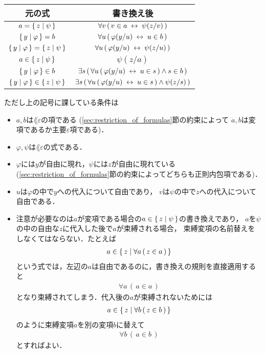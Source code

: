 	\begin{table}[H]
		\begin{center}
		\begin{tabular}{c|c}
			元の式 & 書き換え後 \\ \hline \hline
			$a = \left\{\, z \mid \psi\, \right\}$ & $\forall v\, (\, v \in a \hspace{0.25em}\leftrightarrow\hspace{0.25em} \psi(z/v)\, )$ \\ \hline
			$\left\{\, y \mid \varphi\, \right\} = b$ & $\forall u\, (\, \varphi(y/u) \hspace{0.25em}\leftrightarrow\hspace{0.25em} u \in b\, )$ \\ \hline
			$\left\{\, y \mid \varphi\, \right\} = \left\{\, z \mid \psi\, \right\}$ & $\forall u\, (\, \varphi(y/u) \hspace{0.25em}\leftrightarrow\hspace{0.25em} \psi(z/u)\, )$ \\ \hline
			$a \in \left\{\, z \mid \psi\, \right\}$ & $\psi(z/a)$ \\ \hline
			$\left\{\, y \mid \varphi\, \right\} \in b$ & $\exists s\, (\, \forall u\, (\, \varphi(y/u) \hspace{0.25em}\leftrightarrow\hspace{0.25em} u \in s\, ) \wedge s \in b\, )$ \\ \hline
			$\left\{\, y \mid \varphi\, \right\} \in \left\{\, z \mid \psi\, \right\}$ & $\exists s\, (\, \forall u\, (\, \varphi(y/u) \hspace{0.25em}\leftrightarrow\hspace{0.25em} u \in s\, ) \wedge \psi(z/s)\, )$ \\ \hline
		\end{tabular}
		\end{center}
	\end{table}
	
	ただし上の記号に課している条件は
	\begin{itemize}
		\item $a,b$は$\lang{\varepsilon}$の項である
			(\ref{sec:restriction_of_formulas}節の約束によって
			$a,b$は変項であるか主要$\varepsilon$項である)．
		\item $\varphi,\psi$は$\lang{\varepsilon}$の式である．
		\item $\varphi$には$y$が自由に現れ，$\psi$には$z$が自由に現れている
			(\ref{sec:restriction_of_formulas}節の約束によってどちらも正則内包項である)．
		\item $u$は$\varphi$の中で$y$への代入について自由であり，
			$v$は$\psi$の中で$z$への代入について自由である．
		\item 注意が必要なのは$a$が変項である場合の$a \in \left\{\, z \mid \psi\, \right\}$の書き換えであり，
			$a$を$\psi$の中の自由な$z$に代入した後で$a$が束縛される場合，
			束縛変項の名前替えをしなくてはならない．たとえば
			\begin{align}
				a \in \left\{\, z \mid \forall a\, (\, z \in a\, )\, \right\}
			\end{align}
			という式では，左辺の$a$は自由であるのに，書き換えの規則を直接適用すると
			\begin{align}
				\forall a\, (\, a \in a\, )
			\end{align}
			となり束縛されてしまう．代入後の$a$が束縛されないためには
			\begin{align}
				a \in \left\{\, z \mid \forall b\, (\, z \in b\, )\, \right\}
			\end{align}
			のように束縛変項$a$を別の変項$b$に替えて
			\begin{align}
				\forall b\, (\, a \in b\, )
			\end{align}
			とすればよい．
	\end{itemize}
	
